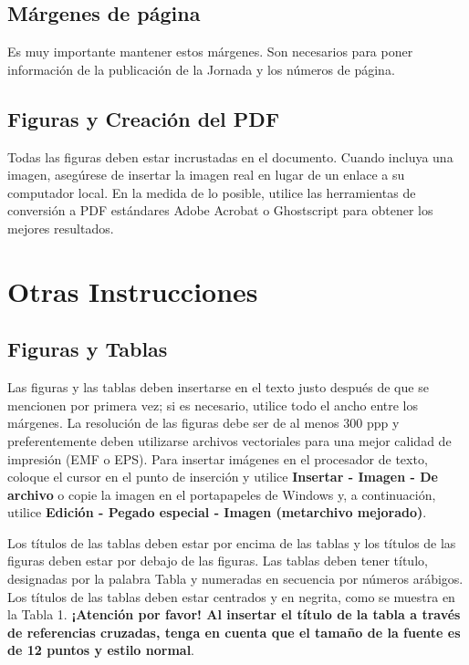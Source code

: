 \documentclass[a4paper, 12pt]{article}
\begin{document}
\subsection{Márgenes de página}

Es muy importante mantener estos márgenes. Son necesarios para poner información de la publicación de la Jornada y los números de página.

\subsection{Figuras y Creación del PDF}

Todas las figuras deben estar incrustadas en el documento. Cuando incluya una imagen, asegúrese de insertar la imagen real en lugar de un enlace a su computador local. En la medida de lo posible, utilice las herramientas de conversión a PDF estándares Adobe Acrobat o Ghostscript para obtener los mejores resultados.

\section{Otras Instrucciones}

\subsection{Figuras y Tablas}

Las figuras y las tablas deben insertarse en el texto justo después de que se mencionen por primera vez; si es necesario, utilice todo el ancho entre los márgenes. La resolución de las figuras debe ser de al menos 300 ppp y preferentemente deben utilizarse archivos vectoriales para una mejor calidad de impresión (EMF o EPS). Para insertar imágenes en el procesador de texto, coloque el cursor en el punto de inserción y utilice \textbf{Insertar - Imagen - De archivo} o copie la imagen en el portapapeles de Windows y, a continuación, utilice \textbf{Edición - Pegado especial - Imagen (metarchivo mejorado)}.

Los títulos de las tablas deben estar por encima de las tablas y los títulos de las figuras deben estar por debajo de las figuras. Las tablas deben tener título, designadas por la palabra Tabla y numeradas en secuencia por números arábigos. Los títulos de las tablas deben estar centrados y en negrita, como se muestra en la Tabla 1. \textbf{¡Atención por favor! Al insertar el título de la tabla a través de referencias cruzadas, tenga en cuenta que el tamaño de la fuente es de 12 puntos y estilo normal}.
\end{document}
